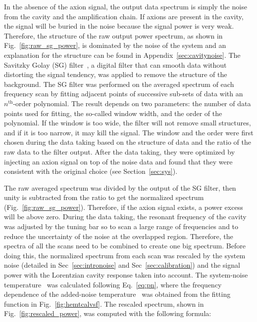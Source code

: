 In the absence of the axion signal, the output data spectrum is simply the 
noise from the cavity and the amplification chain. If axions are present 
in the cavity, the signal will be buried in the noise because the 
signal power is very weak. Therefore, the structure of the raw 
output power spectrum, as shown in Fig.~\ref{fig:raw_sg_power}, is dominated 
by the noise of the system and an explanation for the structure can be found 
in Appendix~\ref{sec:cavitynoise}. The Savitzky Golay (SG) 
filter~\cite{SGFilter}, a digital filter that can smooth data without 
distorting the signal tendency, was applied to remove the structure of the  
background. The SG filter was performed on the averaged spectrum of each 
frequency scan by fitting adjacent points of successive sub-sets of data with 
an $n^\text{th}$-order polynomial. The result depends on two parameters: 
the number of 
data points used for fitting, the so-called window width, and the order of 
the polynomial. If the window is too wide, the filter will not remove small 
structures, and if it is too narrow, it may kill the signal. 
The window and the order were first chosen during the data taking based on 
the structure of data and the ratio of the raw data to the filter output. 
After the data taking, they were optimized by injecting an axion signal on 
top of 
the noise data and found that they were consistent with the original choice 
(see Section~\ref{sec:sys}). 

The raw averaged spectrum was divided by the output of the SG filter, then  
unity is subtracted from the ratio to get the normalized spectrum 
(Fig.~\ref{fig:raw_sg_power}).
Therefore, if the axion signal exists, a power excess will be above zero.
During the data taking, the resonant frequency of the cavity was  
adjusted by the tuning bar so to scan a large range of frequencies and to 
reduce the uncertainty of the noise at the overlapped region. Therefore, the 
spectra of all the scans need to be combined to create one big spectrum. 
Before doing this, 
the normalized spectrum from each scan was rescaled by the system noise 
(detailed in Sec~\ref{sec:intronoise} and Sec~\ref{sec:calibration}) and the 
signal power with the Lorentzian cavity response taken into account. 
The system-noise temperature \tsys\ was calculated following Eq.~\eqref{eq:pn},
 where the frequency dependence of the added-noise temperature \ta\ was obtained 
from the fitting function in Fig.~\ref{fig:hemtcalvsf}. The rescaled spectrum, 
shown in 
Fig.~\ref{fig:rescaled_power}, was computed with the following formula:

